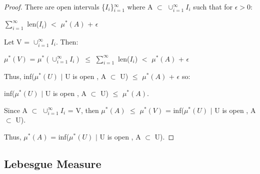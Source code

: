     \begin{proof}
        There are open intervals \{$I_i$\}$_{i=1}^{\infty}$
        where A $\subset$ $\cup_{i=1}^{\infty} I_i$ such that
        for $\epsilon > 0$:

        \hspace{0.5cm}
        $\sum_{i=1}^{\infty}$ len($I_i$)
        $<$ $\mu^*(A)$ + $\epsilon$

        Let V = $\cup_{i=1}^{\infty} I_i$. Then:

        \hspace{0.5cm}
        $\mu^*(V)$
        = $\mu^*(\cup_{i=1}^{\infty} I_i)$
        $\leq$ $\sum_{i=1}^{\infty}$ len($I_i$)
        $<$ $\mu^*(A)$ + $\epsilon$

        Thus,
        inf($\mu^*(U)$ $|$ U is open , A $\subset$ U)
        $\leq$ $\mu^*(A)$ + $\epsilon$ so:
        
        \hspace{0.5cm}
        inf($\mu^*(U)$ $|$ U is open , A $\subset$ U)
        $\leq$ $\mu^*(A)$.

        Since A $\subset$ $\cup_{i=1}^{\infty} I_i$ = V, then
        $\mu^*(A)$ $\leq$ $\mu^*(V)$
        = inf($\mu^*(U)$ $|$ U is open , A $\subset$ U).

        Thus, $\mu^*(A)$ = inf($\mu^*(U)$ $|$ U is open , A $\subset$ U).
    \end{proof}

    \newpage





\subsection{ Lebesgue Measure }

